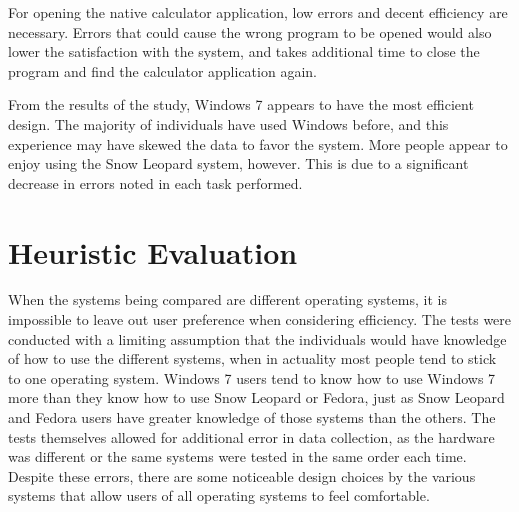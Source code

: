\documentclass[11pt,letterpaper]{report}
\begin{document}
For opening the native calculator application, low errors and decent efficiency are necessary. Errors that could cause the wrong program to be opened would also lower the satisfaction with the system, and takes additional time to close the program and find the calculator application again. 

From the results of the study, Windows 7 appears to have the most efficient design. The majority of individuals have used Windows before, and this experience may have skewed the data to favor the system. More people appear to enjoy using the Snow Leopard system, however. This is due to a significant decrease in errors noted in each task performed. 
%

\chapter{Heuristic Evaluation}
When the systems being compared are different operating systems, it is impossible to leave out user preference when considering efficiency. The tests were conducted with a limiting assumption that the individuals would have knowledge of how to use the different systems, when in actuality most people tend to stick to one operating system. Windows 7 users tend to know how to use Windows 7 more than they know how to use Snow Leopard or Fedora, just as Snow Leopard and Fedora users have greater knowledge of those systems than the others. The tests themselves allowed for additional error in data collection, as the hardware was different or the same systems were tested in the same order each time. Despite these errors, there are some noticeable design choices by the various systems that allow users of all operating systems to feel comfortable.
\end{document}
